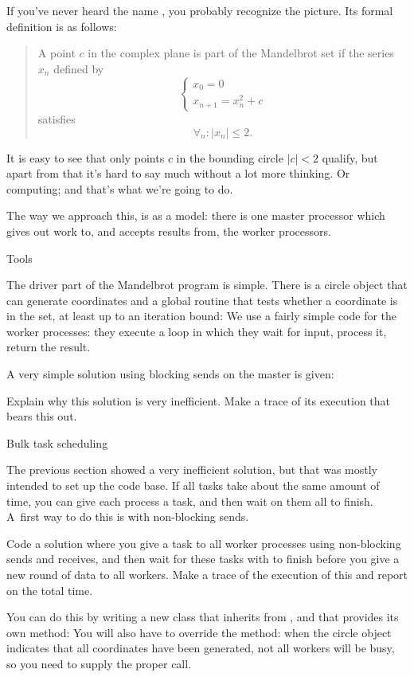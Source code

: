 If you've never heard the name , you
probably recognize the picture. Its formal definition is as follows:
\begin{quotation}\noindent
  A point $c$ in the complex plane is part of the Mandelbrot set if 
  the series $x_n$ defined by 
  \[ 
  \begin{cases}
    x_0=0\\ x_{n+1}=x_n^2+c
  \end{cases}
  \] satisfies \[ \forall_n\colon |x_n|\leq 2. \]  
\end{quotation}
It is easy to see that only points $c$ in the bounding circle
$|c|< 2$ qualify, but
apart from that it's hard to say much without a lot more thinking.
Or computing; and that's what we're going to do.

The way we approach this, is as a  model: 
there is one master processor which gives out work to, and accepts
results from, the worker processors.

 {Tools}

The driver part of the Mandelbrot program is simple. There is a 
circle object that can generate coordinates
and a global routine that tests whether a coordinate is in the set,
at least up to an iteration bound:
We use a fairly simple code for the worker processes: they 
execute a loop in which they wait 
for input, process it, return the result.

A very simple solution using blocking sends on the master is given:

\begin{exercise}
  Explain why this solution is very inefficient. Make a trace of its
  execution that bears this out.
\end{exercise}

 {Bulk task scheduling}
\label{proj:mandel-bulk}

The previous section showed a very inefficient solution, but that was mostly
intended to set up the code base. If all tasks take about the same amount of time,
you can give each process a task, and then wait on them all to finish. A~first way
to do this is with non-blocking sends.

\begin{exercise}
  Code a  solution where you give a task to all worker processes
  using non-blocking sends and receives, and then wait for these tasks
  with 
  to finish before you give a new round of data to all workers.
  Make a trace of the execution of this and report on the total time.

  You can do this by writing a new class that inherits from ,
  and that provides its own  method:
  You will also have to override the  method: when the circle 
  object indicates that all coordinates have been generated, not all
  workers will be busy, so you need to supply the proper 
  call.
\end{exercise}

